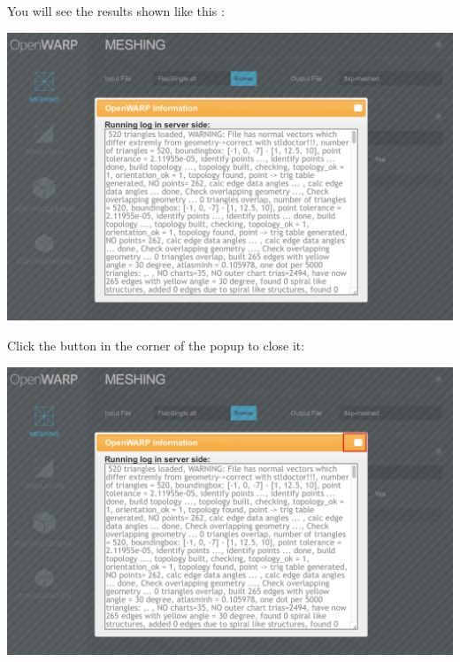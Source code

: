 \documentclass[12pt]{article}
\begin{document}
You will see the results shown like this :

\vspace{\abovedisplayskip}
\begin{minipage}{\linewidth}
	\centering
	\includegraphics[scale=0.5]{img/45}
\end{minipage}
\vspace{\belowdisplayskip}





Click the button in the corner of the popup to close it:

\vspace{\abovedisplayskip}
\begin{minipage}{\linewidth}
	\centering
	\includegraphics[scale=0.5]{img/46}
\end{minipage}
\vspace{\belowdisplayskip}
\end{document}
